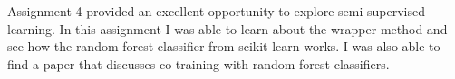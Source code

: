 Assignment 4 provided an excellent opportunity to explore semi-supervised learning. In this assignment I was able to learn about the wrapper method and see how the random forest classifier from scikit-learn works. I was also able to find a paper that discusses co-training with random forest classifiers.
